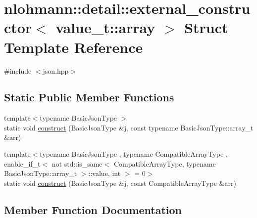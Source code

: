 \hypertarget{structnlohmann_1_1detail_1_1external__constructor_3_01value__t_1_1array_01_4}{}\section{nlohmann\+::detail\+::external\+\_\+constructor$<$ value\+\_\+t\+::array $>$ Struct Template Reference}
\label{structnlohmann_1_1detail_1_1external__constructor_3_01value__t_1_1array_01_4}


{\ttfamily \#include $<$json.\+hpp$>$}

\subsection*{Static Public Member Functions}
\begin{DoxyCompactItemize}
\item 
{\footnotesize template$<$typename Basic\+Json\+Type $>$ }\\static void \mbox{\hyperlink{structnlohmann_1_1detail_1_1external__constructor_3_01value__t_1_1array_01_4_abfb2a6eec0bc21e8a7438546aebc55d8}{construct}} (Basic\+Json\+Type \&j, const typename Basic\+Json\+Type\+::array\+\_\+t \&arr)
\item 
{\footnotesize template$<$typename Basic\+Json\+Type , typename Compatible\+Array\+Type , enable\+\_\+if\+\_\+t$<$ not std\+::is\+\_\+same$<$ Compatible\+Array\+Type, typename Basic\+Json\+Type\+::array\+\_\+t $>$\+::value, int $>$  = 0$>$ }\\static void \mbox{\hyperlink{structnlohmann_1_1detail_1_1external__constructor_3_01value__t_1_1array_01_4_a110f50fd5378da876d9a6d6a8d945e37}{construct}} (Basic\+Json\+Type \&j, const Compatible\+Array\+Type \&arr)
\end{DoxyCompactItemize}


\subsection{Member Function Documentation}
\mbox{\label{structnlohmann_1_1detail_1_1external__constructor_3_01value__t_1_1array_01_4_abfb2a6eec0bc21e8a7438546aebc55d8}} 
